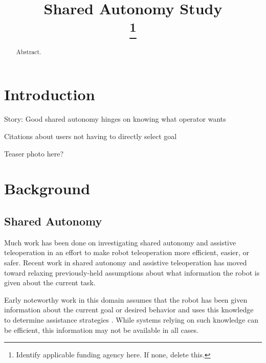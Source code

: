 \documentclass[conference]{IEEEtran}
\begin{document}
\title{Shared Autonomy Study\\
\thanks{Identify applicable funding agency here. If none, delete this.}
}

\author{
\and
{}
}

\maketitle

\begin{abstract}
Abstract.
\end{abstract}

\section{Introduction}

Story: Good shared autonomy hinges on knowing what operator wants

Citations about users not having to directly select goal

Teaser photo here?

\section{Background}
\subsection{Shared Autonomy}

Much work has been done on investigating shared autonomy and assistive teleoperation in an effort to make robot teleoperation more efficient, easier, or safer. Recent work in shared autonomy and assistive teleoperation has moved toward relaxing previously-held assumptions about what information the robot is given about the current task. 

Early noteworthy work in this domain assumes that the robot has been given information about the current goal or desired behavior and uses this knowledge to determine assistance strategies \cite{aigner1997human, debus2001cooperative, goodrich2001experiments}. While systems relying on such knowledge can be efficient, this information may not be available in all cases.
\end{document}
